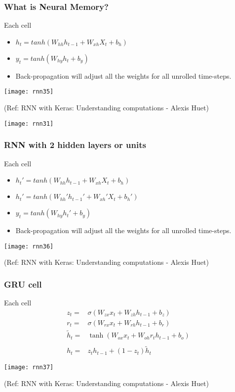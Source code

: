 \begin{frame}[fragile] \frametitle{What is Neural Memory?}
Each cell
\begin{itemize}
\item $h_t = tanh(W_{hh}h_{t-1} + W_{xh}X_t + b_h)$
\item $y_t = tanh(W_{hy}h_t + b_y)$
\item Back-propagation will adjust all the weights for all unrolled time-steps.
\end{itemize}


\begin{center}
\texttt{[image: rnn35]}

{\tiny (Ref: RNN with Keras: Understanding computations - Alexis Huet)}


\texttt{[image: rnn31]}
\end{center}
\end{frame}


\begin{frame}[fragile] \frametitle{RNN with 2 hidden layers or units}
Each cell
\begin{itemize}
\item $h_t' = tanh(W_{hh}h_{t-1} + W_{xh}X_t + b_h)$
\item $h_t' = tanh(W_{hh}'h_{t-1}' + W_{xh}'X_t + b_h')$
\item $y_t = tanh(W_{hy}h_t' + b_y)$
\item Back-propagation will adjust all the weights for all unrolled time-steps.
\end{itemize}


\begin{center}
\texttt{[image: rnn36]}

{\tiny (Ref: RNN with Keras: Understanding computations - Alexis Huet)}
\end{center}
\end{frame}

\begin{frame}[fragile] \frametitle{GRU cell}
Each cell
\begin{align*}
z_t =& \sigma(W_{zx} x_t + W_{zh} h_{t-1} + b_z) \\
r_t =& \sigma(W_{rx} x_t + W_{rh} h_{t-1} + b_r) \\
\tilde{h}_t =& \tanh(W_{ox} x_t + W_{oh} r_t h_{t-1} + b_o) \\
 \\
h_t =& z_t h_{t-1} + (1 - z_t) \tilde{h}_t
\end{align*} %


\begin{center}
\texttt{[image: rnn37]}

{\tiny (Ref: RNN with Keras: Understanding computations - Alexis Huet)}
\end{center}
\end{frame}

